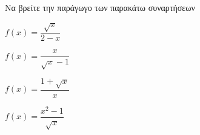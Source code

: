 Να βρείτε την παράγωγο των παρακάτω συναρτήσεων
\begin{multicols}{2}
\begin{alist}
\item $ f(x)=\dfrac{\sqrt{x}}{2-x} $
\item $ f(x)=\dfrac{x}{\sqrt{x}-1} $
\item $ f(x)=\dfrac{1+\sqrt{x}}{x} $
\item $ f(x)=\dfrac{x^2-1}{\sqrt{x}} $
\end{alist}
\end{multicols}
